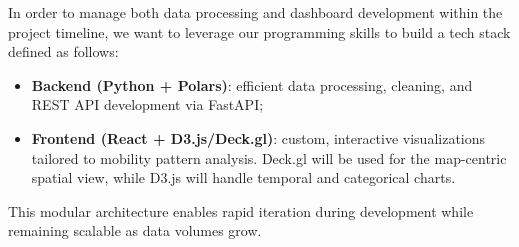 In order to manage both data processing and dashboard development within the project timeline, we want to leverage our programming skills to build a tech stack defined as follows:
\begin{itemize}[beginpenalty=10000]
  \item \textbf{Backend (Python + Polars)}: efficient data processing, cleaning, and REST API development via FastAPI;
  \item \textbf{Frontend (React + D3.js/Deck.gl)}: custom, interactive visualizations tailored to mobility pattern analysis.
  Deck.gl will be used for the map-centric spatial view, while D3.js will handle temporal and categorical charts. 
\end{itemize}
This modular architecture enables rapid iteration during development while remaining scalable as data volumes grow.